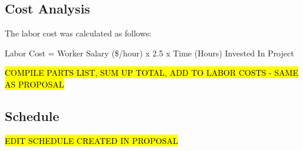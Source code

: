 \documentclass[letterpaper,10pt]{article}
\begin{document}
\begin{spacing}{1.15}
\subsection{Cost Analysis}
The labor cost was calculated as follows:

\begin{center}
	Labor Cost = Worker Salary (\$/hour) x 2.5 x Time (Hours) Invested In Project
\end{center}

\hl{COMPILE PARTS LIST, SUM UP TOTAL, ADD TO LABOR COSTS - SAME AS PROPOSAL}

\subsection{Schedule}
\hl{EDIT SCHEDULE CREATED IN PROPOSAL}


\clearpage


\clearpage
\end{spacing}
\end{document}
